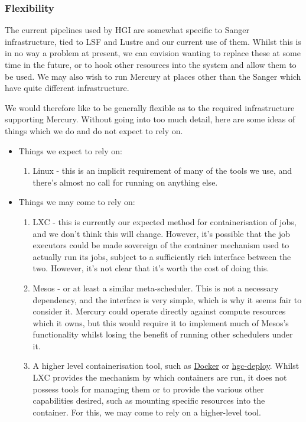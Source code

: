 \documentclass[10pt,a4paper]{article}
\newcommand{\npar}{\par\noindent\space}
\begin{document}
\subsubsection{Flexibility}
\label{sec:flexibility}
\npar The current pipelines used by HGI are somewhat specific to Sanger infrastructure, tied to LSF and Lustre and our current use of them. Whilst this is in no way a problem at present, we can envision wanting to replace these at some time in the future, or to hook other resources into the system and allow them to be used. We may also wish to run Mercury at places other than the Sanger which have quite different infrastructure.
\npar We would therefore like to be generally flexible as to the required infrastructure supporting Mercury. Without going into too much detail, here are some ideas of things which we do and do not expect to rely on.
\begin{itemize}
\item Things we expect to rely on:
\begin{enumerate}
\item Linux - this is an implicit requirement of many of the tools we use, and there's almost no call for running on anything else.
\end{enumerate}
\item Things we may come to rely on:
\begin{enumerate}
\item LXC - this is currently our expected method for containerisation of jobs, and we don't think this will change. However, it's possible that the \glspl{job executor} could be made sovereign of the container mechanism used to actually run its jobs, subject to a sufficiently rich interface between the two. However, it's not clear that it's worth the cost of doing this.
\item Mesos - or at least a similar meta-scheduler. This is not a necessary dependency, and the interface is very simple, which is why it seems fair to consider it. Mercury could operate directly against compute resources which it owns, but this would require it to implement much of Mesos's functionality whilst losing the benefit of running other schedulers under it.
\item A higher level containerisation tool, such as \href{https://www.docker.io/}{Docker} or \href{https://github.com/wtsi-hgi/hgc-tools}{hgc-deploy}. Whilst LXC provides the mechanism by which containers are run, it does not possess tools for managing them or to provide the various other capabilities desired, such as mounting specific resources into the container. For this, we may come to rely on a higher-level tool.

\end{enumerate}
\end{itemize}
\end{document}
